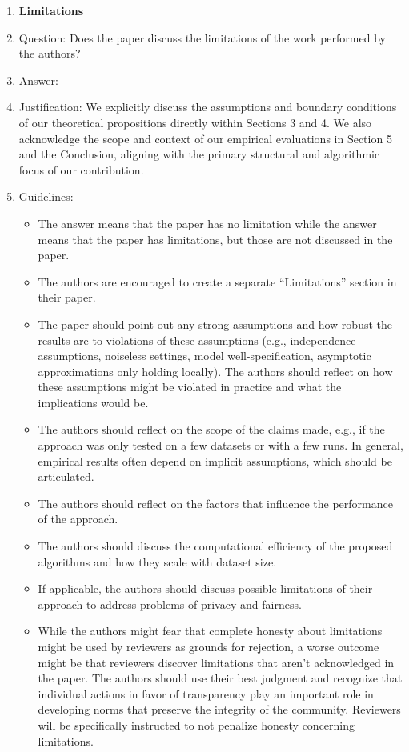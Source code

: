 \begin{enumerate}
\item {\bf Limitations}
    \item[] Question: Does the paper discuss the limitations of the work performed by the authors?
    \item[] Answer: \answerYes{}
    \item[] Justification: We explicitly discuss the assumptions and boundary conditions of our theoretical propositions directly within Sections 3 and 4. We also acknowledge the scope and context of our empirical evaluations in Section 5 and the Conclusion, aligning with the primary structural and algorithmic focus of our contribution.
    \item[] Guidelines:
    \begin{itemize}
        \item The answer \answerNA{} means that the paper has no limitation while the answer \answerNo{} means that the paper has limitations, but those are not discussed in the paper. 
        \item The authors are encouraged to create a separate ``Limitations'' section in their paper.
        \item The paper should point out any strong assumptions and how robust the results are to violations of these assumptions (e.g., independence assumptions, noiseless settings, model well-specification, asymptotic approximations only holding locally). The authors should reflect on how these assumptions might be violated in practice and what the implications would be.
        \item The authors should reflect on the scope of the claims made, e.g., if the approach was only tested on a few datasets or with a few runs. In general, empirical results often depend on implicit assumptions, which should be articulated.
        \item The authors should reflect on the factors that influence the performance of the approach.
        \item The authors should discuss the computational efficiency of the proposed algorithms and how they scale with dataset size.
        \item If applicable, the authors should discuss possible limitations of their approach to address problems of privacy and fairness.
        \item While the authors might fear that complete honesty about limitations might be used by reviewers as grounds for rejection, a worse outcome might be that reviewers discover limitations that aren't acknowledged in the paper. The authors should use their best judgment and recognize that individual actions in favor of transparency play an important role in developing norms that preserve the integrity of the community. Reviewers will be specifically instructed to not penalize honesty concerning limitations.
    \end{itemize}


\end{enumerate}
